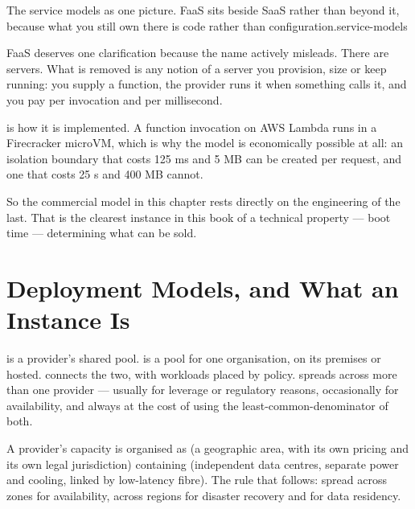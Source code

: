 {}%
{The service models as one picture. FaaS sits beside SaaS rather than beyond
it, because what you still own there is code rather than
configuration.}{service-models}

\begin{conceptbox}
FaaS deserves one clarification because the name actively misleads. There are
servers. What is removed is any notion of a server you provision, size or keep
running: you supply a function, the provider runs it when something calls it,
and you pay per invocation and per millisecond.

\smallskip
{} is how it is implemented. A function invocation on AWS
Lambda runs in a Firecracker microVM, which is why the model is economically
possible at all: an isolation boundary that costs 125 ms and 5 MB can be
created per request, and one that costs 25 s and 400 MB cannot.

\smallskip
So the commercial model in this chapter rests directly on the engineering of
the last. That is the clearest instance in this book of a technical property
--- boot time --- determining what can be sold.
\end{conceptbox}

\section{Deployment Models, and What an Instance Is}

 is a provider's shared pool.  is a pool for one
organisation, on its premises or hosted.  connects the two, with
workloads placed by policy.  spreads across more than one
provider --- usually for leverage or regulatory reasons, occasionally for
availability, and always at the cost of using the least-common-denominator of
both.

A provider's capacity is organised as  (a geographic area, with
its own pricing and its own legal jurisdiction) containing
 (independent data centres, separate power and
cooling, linked by low-latency fibre). The rule that follows: spread across
zones for availability, across regions for disaster recovery and for data
residency.

